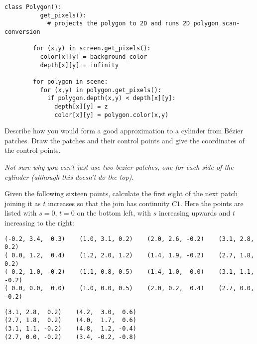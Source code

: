 \documentclass{supervision}
\begin{document}
\begin{questions}
\begin{solution}
\begin{lstlisting}[gobble=8]
        class Polygon():
          get_pixels():
            # projects the polygon to 2D and runs 2D polygon scan-conversion

        for (x,y) in screen.get_pixels():
          color[x][y] = background_color
          depth[x][y] = infinity

        for polygon in scene:
          for (x,y) in polygon.get_pixels():
            if polygon.depth(x,y) < depth[x][y]:
              depth[x][y] = z
              color[x][y] = polygon.color(x,y)
      \end{lstlisting}

    \end{solution}

  \question Describe how you would form a good approximation to a cylinder
    from Bézier patches. Draw the patches and their control points and give
    the coordinates of the control points.
    \begin{solution}
      \emph{Not sure why you can't just use two bezier patches, one for each side of the cylinder (although this doesn't do the top).}
    \end{solution}

  \question Given the following sixteen points, calculate the first eight of
    the next patch joining it as $t$ increases so that the join has continuity
    $C1$. Here the points are listed with $s=0$, $t=0$ on the bottom left,
    with $s$ increasing upwards and $t$ increasing to the right:
    \begin{Verbatim}[fontsize=\scriptsize]
(-0.2, 3.4,  0.3)    (1.0, 3.1, 0.2)    (2.0, 2.6, -0.2)    (3.1, 2.8,  0.2)
( 0.0, 1.2,  0.4)    (1.2, 2.0, 1.2)    (1.4, 1.9, -0.2)    (2.7, 1.8,  0.2)
( 0.2, 1.0, -0.2)    (1.1, 0.8, 0.5)    (1.4, 1.0,  0.0)    (3.1, 1.1, -0.2)
( 0.0, 0.0,  0.0)    (1.0, 0.0, 0.5)    (2.0, 0.2,  0.4)    (2.7, 0.0, -0.2)
    \end{Verbatim}
    \begin{solution}
      \begin{Verbatim}[fontsize=\scriptsize]
(3.1, 2.8,  0.2)    (4.2,  3.0,  0.6)
(2.7, 1.8,  0.2)    (4.0,  1.7,  0.6)
(3.1, 1.1, -0.2)    (4.8,  1.2, -0.4)
(2.7, 0.0, -0.2)    (3.4, -0.2, -0.8)
      \end{Verbatim}
    \end{solution}
\end{questions}

\section*{\Topics}
\end{document}
